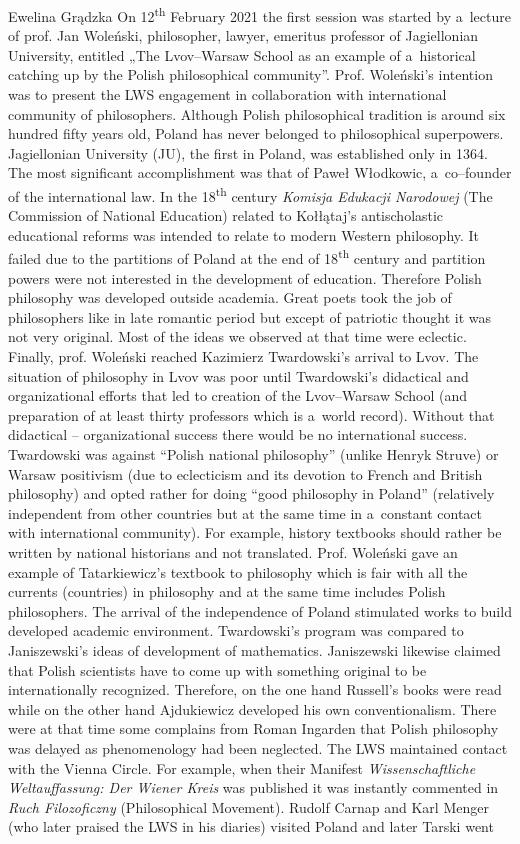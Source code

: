 \begin{editorialeng}{Ewelina Grądzka}
On 12\textsuperscript{th} February 2021 the first session was started by a~lecture of prof. Jan Woleński, philosopher, lawyer, emeritus professor of Jagiellonian University, entitled „The Lvov--Warsaw School as an example of a~historical catching up by the Polish philosophical community”. Prof. Woleński’s intention was to present the LWS engagement in collaboration with international community of philosophers. Although Polish philosophical tradition is around six hundred fifty years old, Poland has never belonged to philosophical superpowers. Jagiellonian University (JU), the first in Poland, was established only in 1364. The most significant accomplishment was that of Paweł Włodkowic, a~co--founder of the international law. In the 18\textsuperscript{th} century \textit{Komisja Edukacji Narodowej} (The Commission of National Education) related to Kołłątaj’s antischolastic educational reforms was intended to relate to modern Western philosophy. It failed due to the partitions of Poland at the end of 18\textsuperscript{th} century and partition powers were not interested in the development of education. Therefore Polish philosophy was developed outside academia. Great poets took the job of philosophers like in late romantic period but except of patriotic thought it was not very original. Most of the ideas we observed at that time were eclectic. Finally, prof. Woleński reached Kazimierz Twardowski’s arrival to Lvov. The situation of philosophy in Lvov was poor until Twardowski’s didactical and organizational efforts that led to creation of the Lvov--Warsaw School (and preparation of at least thirty professors which is a~world record). Without that didactical -- organizational success there would be no international success. Twardowski was against “Polish national philosophy” (unlike Henryk Struve) or Warsaw positivism (due to eclecticism and its devotion to French and British philosophy) and opted rather for doing “good philosophy in Poland” (relatively independent from other countries but at the same time in a~constant contact with international community). For example, history textbooks should rather be written by national historians and not translated. Prof. Woleński gave an example of Tatarkiewicz’s textbook to philosophy which is fair with all the currents (countries) in philosophy and at the same time includes Polish philosophers. The arrival of the independence of Poland stimulated works to build developed academic environment. Twardowski’s program was compared to Janiszewski’s ideas of development of mathematics. Janiszewski likewise claimed that Polish scientists have to come up with something original to be internationally recognized. Therefore, on the one hand Russell’s books were read while on the other hand Ajdukiewicz developed his own conventionalism. There were at that time some complains from Roman Ingarden that Polish philosophy was delayed as phenomenology had been neglected. The LWS maintained contact with the Vienna Circle. For example, when their Manifest \textit{Wissenschaftliche Weltauffassung: Der Wiener Kreis} was published it was instantly commented in \textit{Ruch Filozoficzny} (Philosophical Movement). Rudolf Carnap and Karl Menger (who later praised the LWS in his diaries) visited Poland and later Tarski went 
\end{editorialeng}
